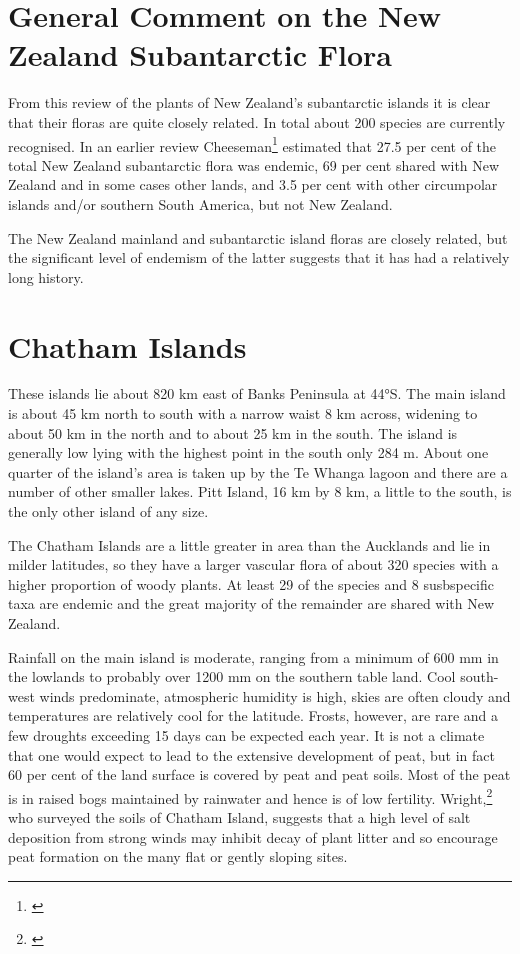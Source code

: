 \section{General Comment on the New Zealand Subantarctic Flora}

From this review of the plants of New Zealand's subantarctic islands it is clear that their floras are quite closely related.
In total about 200 species are currently recognised.
In an earlier review Cheeseman\footnote{\cite{cheeseman1909systematic}} estimated that 27.5 per cent of the total New Zealand subantarctic flora was endemic, 69 per cent shared with New Zealand and in some cases other lands, and 3.5 per cent with other circumpolar islands and/or southern South America, but not New Zealand.

The New Zealand mainland and subantarctic island floras are closely related, but the significant level of endemism of the latter suggests that it has had a relatively long history.

\section{Chatham Islands}

These islands lie about 820 km east of Banks Peninsula at 44°S.
The main island is about 45 km north to south with a narrow waist 8 km across, widening to about 50 km in the north and to about 25 km in the south.
The island is generally low lying with the highest point in the south only 284 m.
About one quarter of the island's area is taken up by the Te Whanga lagoon and there are a number of other smaller lakes.
Pitt Island, 16 km by 8 km, a little to the south, is the only other island of any size.

The Chatham Islands are a little greater in area than the Aucklands and lie in milder latitudes, so they have a larger vascular flora of about 320 species with a higher proportion of woody plants.
At least 29 of the species and 8 susbspecific taxa are endemic and the great majority of the remainder are shared with New Zealand.

Rainfall on the main island is moderate, ranging from a minimum of 600 mm in the lowlands to probably over 1200 mm on the southern table land.
Cool south-west winds predominate, atmospheric humidity is high, skies are often cloudy and temperatures are relatively cool for the latitude.
Frosts, however, are rare and a few droughts exceeding 15 days can be expected each year.
It is not a climate that one would expect to lead to the extensive development of peat, but in fact 60 per cent of the land surface is covered by peat and peat soils.
Most of the peat is in raised bogs maintained by rainwater and hence is of low fertility.
Wright,\footnote{\cite{wright1959soils}} who surveyed the soils of Chatham Island, suggests that a high level of salt deposition from strong winds may inhibit decay of plant litter and so encourage peat formation on the many flat or gently sloping sites.

